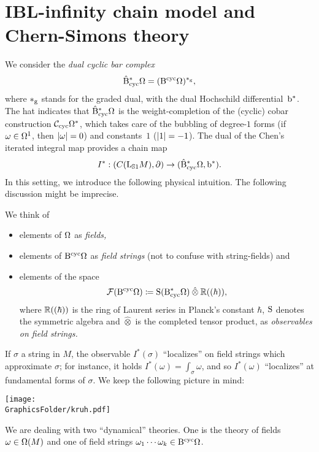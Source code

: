 \documentclass[\MainFolder/Text.tex]{subfiles}
\begin{document}
\section{IBL-infinity chain model and Chern-Simons theory}

We consider the \emph{dual cyclic bar complex}
$$ \hat{\mathrm{B}}_{\mathrm{cyc}}^* \Omega = (\mathrm{B}^{\mathrm{cyc}}\Omega)^{*_{\mathrm{g}}}, $$
where $*_{\mathrm{g}}$ stands for the graded dual, with the dual Hochschild differential~$\mathrm{b}^*$. The hat indicates that $\hat{\mathrm{B}}_{\mathrm{cyc}}^* \Omega$ is the weight-completion of the (cyclic) cobar construction $\mathcal{C}_{\mathrm{cyc}} \Omega^*$, which takes care of the bubbling of degree-$1$ forms (if $\omega\in \Omega^1$, then $|\omega| = 0$) and constants~$1$ ($|1| = -1$). The dual of the Chen's iterated integral map provides a chain map 
$$I^*: (C(\mathrm{L}_{\mathbb{S}{1}} M),\partial) \rightarrow (\hat{\mathrm{B}}_{\mathrm{cyc}}^*\Omega,\mathrm{b}^*).$$
In this setting, we introduce the following physical intuition. The following discussion might be imprecise.

We think of
\begin{itemize}
\item elements of $\Omega$ as \emph{fields,}
\item elements of $\mathrm{B}^{\mathrm{cyc}} \Omega$ as \emph{field strings} (not to confuse with string-fields) and
\item elements of the space
$$ \Fun(\BCyc \DR) \coloneqq \Sym(\DBCyc\DR)\COtimes \R((\hbar)), $$
where $\mathbb{R}((\hbar))$ is the ring of Laurent series in Planck's constant $\hbar$, $\mathrm{S}$ denotes the symmetric algebra and $\hat{\otimes}$ is the completed tensor product, as \emph{observables on field strings.}
\end{itemize}
If $\sigma$ a string in $M$, the observable $I^*(\sigma)$ ``localizes'' on field strings which approximate $\sigma$; for instance, it holds $I^*(\omega) = \int_{\sigma} \omega$, and so $I^*(\omega)$ ``localizes'' at fundamental forms of $\sigma$. We keep the following picture in mind:
\begin{center}
 \texttt{[image: \\GraphicsFolder/kruh.pdf]}
\end{center}
We are dealing with two ``dynamical'' theories. One is the theory of fields $\omega\in \Omega(M)$ and one of field strings $\omega_1 \dotsb \omega_k \in \mathrm{B}^{\mathrm{cyc}} \Omega$.
\end{document}

